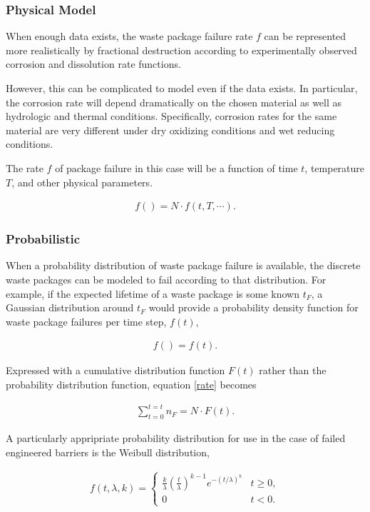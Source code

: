 \subsubsection{Physical Model}

When enough data exists, the waste package failure rate $f$ can
be represented more realistically by fractional destruction according to
experimentally observed corrosion and dissolution rate functions.

However, this can be complicated to model even if the data exists. In
particular, the corrosion rate will depend dramatically on the chosen material 
as well as hydrologic and thermal conditions. Specifically, corrosion rates for 
the same material are very different under dry oxidizing conditions and wet 
reducing conditions. 

The rate $f$ of package  failure in this case will be a function of time $t$, 
temperature $T$, and other physical parameters.

\begin{align}
  f() = N\cdot f(t,T,\cdots).
  \label{rate}
\end{align}

\subsubsection{Probabilistic}

When a probability distribution of waste package failure is available, the 
discrete waste packages can be modeled to fail according to that distribution. 
For example, if the expected lifetime of a waste package is some known $t_F$, a 
Gaussian distribution around $t_F$ would provide a probability density function 
for waste package failures per time step, $f(t)$,

\begin{align}
  f()=f(t).
  \label{probabilistic}
\end{align}

Expressed with a cumulative distribution function $F(t)$ rather than the
probability distribution function, equation \eqref{rate} becomes 


\begin{align}
  \sum_{t=0}^{t=t}n_F=N\cdot F(t).
  \label{cdf}
\end{align}


A particularly appripriate probability distribution for use in the case of failed 
engineered barriers is the Weibull distribution, 

\begin{align}
  f(t,\lambda,k) =  \begin{cases}
    \frac{k}{\lambda}\left(\frac{t}{\lambda}\right)^{k-1}e^{-(t/\lambda)^{k}} & 
    t\geq0 ,\\
    0 & t<0 .\end{cases}
  \label{weibullpdf}
\end{align}


